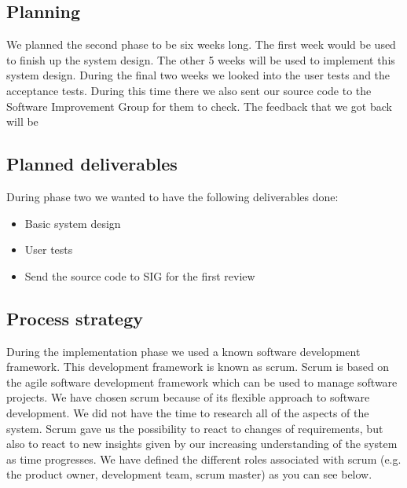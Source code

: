 \subsection{Planning}
We planned the second phase to be six weeks long.
The first week would be used to finish up the system design.
The other 5 weeks will be used to implement this system design.
During the final two weeks we looked into the user tests and the acceptance tests.
During this time there we also sent our source code to the Software Improvement Group for them to check.
The feedback that we got back will be 

\subsection{Planned deliverables}
During phase two we wanted to have the following deliverables done:
\begin{itemize}
\item Basic system design
\item User tests
\item Send the source code to SIG for the first review
\end{itemize}

\subsection{Process strategy}
During the implementation phase we used a known software development framework.
This development framework is known as scrum.
Scrum is based on the agile software development framework which can be used to manage software projects.
We have chosen scrum because of its flexible approach to software development.
We did not have the time to research all of the aspects of the system.
Scrum gave us the possibility to react to changes of requirements, but also to react to new insights given by our increasing understanding of the system as time progresses.
We have defined the different roles associated with scrum (e.g. the product owner, development team, scrum master) as you can see below.

